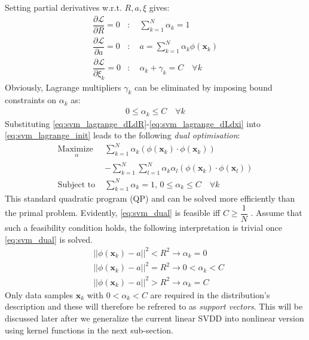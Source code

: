 \documentclass[conference]{IEEEtran}
\theoremstyle{problemstyle}
\begin{document}
Setting partial derivatives w.r.t. $R, a, \xi$ gives:
\begin{subequations}
\begin{align}
\dfrac{\partial \mathcal{L}}{\partial R} = 0 &: \quad \sum_{k=1}^N \alpha_k = 1 \label{eq:svm_lagrange_dLdR} \\
\dfrac{\partial \mathcal{L}}{\partial a} = 0 &: \quad a = \sum_{k=1}^N \alpha_k \phi \left( \mathbf{x}_k \right) \label{eq:svm_lagrange_dLda} \\
\dfrac{\partial \mathcal{L}}{\partial \xi_k} = 0 &: \quad \alpha_k + \gamma_k = C \quad \forall k \label{eq:svm_lagrange_dLdxi}
\end{align}
\end{subequations}
Obviously, Lagrange multipliers $\gamma_k$ can be eliminated by imposing bound constraints on $\alpha_k$ as:
\begin{align}
0\le \alpha_k \le C \quad \forall k
\end{align}
Substituting \eqref{eq:svm_lagrange_dLdR}-\eqref{eq:svm_lagrange_dLdxi} into \eqref{eq:svm_lagrange_init} leads to the following \emph{dual optimisation}:
\begin{subequations}\label{eq:svm_dual}
\begin{align}
\underset{
	\begin{array}{c}
		 \alpha
	\end{array}}{\text{Maximize }} &\sum_{k=1}^N \alpha_k \left( \phi \left( \mathbf{x}_k \right) \cdot \phi \left( \mathbf{x}_k \right) \right) \nonumber \\&- \sum_{k=1}^N \sum_{l=1}^N \alpha_k \alpha_l \left( \phi \left( \mathbf{x}_k \right) \cdot \phi \left( \mathbf{x}_l \right) \right) \\
\text{Subject to } &\sum_{k=1}^N \alpha_k = 1 \text{, } 0 \le \alpha_k \le C \quad \forall k
\end{align}
\end{subequations}
This standard quadratic program (QP) and can be solved more efficiently than the primal problem. Evidently, \eqref{eq:svm_dual} is feasible iff $C \ge \dfrac{1}{N}$ \cite{chang2013revisit}. Assume that such a feasibility condition holds, the following interpretation is trivial once \eqref{eq:svm_dual} is solved.
\begin{subequations}
\begin{align}
&\left|\left| \phi \left( \mathbf{x}_k \right) - a \right|\right|^2 < R^2 \to \alpha_k = 0 \\
&\left|\left| \phi \left( \mathbf{x}_k \right) - a \right|\right|^2 = R^2 \to 0 < \alpha_k < C \label{eq:sv_alpha}\\
&\left|\left| \phi \left( \mathbf{x}_k \right) - a \right|\right|^2 > R^2 \to \alpha_k = C
\end{align}
\end{subequations}
Only data samples $\mathbf{x}_k$ with $0 < \alpha_k < C$ are required in the distribution's description and these will therefore be refrered to as \emph{support vectors}. This will be discussed later after we generalize the current linear SVDD into nonlinear version using kernel functions in the next sub-section. 
\end{document}
